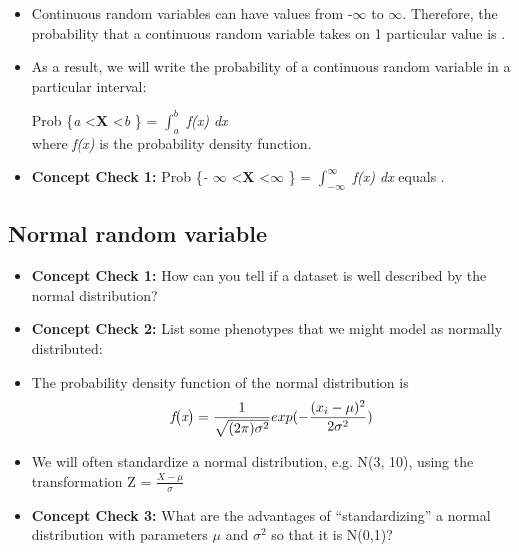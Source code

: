 \documentclass[12pt]{report}
\begin{document}
\begin{itemize}

\item Continuous random variables can have values from -$\infty$ to $\infty$. Therefore, the probability that a continuous random variable takes on 1 particular value is \hrulefill. 

\item As a result, we will write the probability of a continuous random variable in a particular interval:

\bigskip
Prob \{\textit{a} \textless \textbf{X} \textless \textit{b} \} = $\int_{a}^{b}$ \textit{f\big(x\big) dx} \\

where \textit{f\big(x\big)} is the probability density function. 

\item \textbf{Concept Check 1:} Prob \{\textit{- $\infty$} \textless \textbf{X} \textless \textit{$\infty$} \} = $\int_{- \infty}^{\infty}$ \textit{f\big(x\big) dx} equals \hrulefill.

\end{itemize}

\subsection{Normal random variable}

\begin{itemize}

\item  \textbf{Concept Check 1:} How can you tell if a dataset is well described by the normal distribution? 

\bigskip

\bigskip

\bigskip

\item \textbf{Concept Check 2:} List some phenotypes that we might model as normally distributed:

\bigskip

\bigskip

\bigskip

\item The probability density function of the normal distribution is 
\begin{eqnarray}
\textit{f\big(x\big)} = \frac{1}{\sqrt{(2\pi)\sigma^{2}}} exp(-\frac{(x_{i}-\mu)^{2}}{2\sigma^{2}} )
\end{eqnarray}

\bigskip
\item We will often standardize a normal distribution, e.g. N(3, 10), using the transformation Z = 
$\frac{\textit{X} - \mu}{\sigma}$


\item  \textbf{Concept Check 3:} What are the advantages of ``standardizing'' a normal distribution with parameters $\mu$ and $\sigma^{2}$ so that it is N(0,1)?

\end{itemize}
\end{document}
